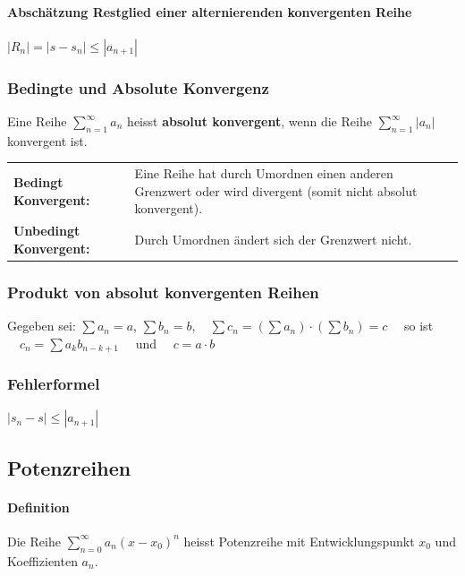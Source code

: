 \paragraph{Abschätzung Restglied einer alternierenden konvergenten Reihe}
	\qquad $|R_n| = |s-s_n|\leq |a_{n+1}|$


\subsubsection{Bedingte und Absolute Konvergenz}
Eine Reihe $\sum\limits_{n=1}^{\infty}a_n$ heisst \textbf{absolut konvergent}, wenn die
Reihe $\sum\limits_{n=1}^{\infty}|a_n|$ konvergent ist.\\

\begin{tabular}{ p{4.5cm}  p{13.5cm}}
	\textbf{Bedingt Konvergent:} &  Eine Reihe hat durch Umordnen einen anderen Grenzwert oder wird divergent (somit nicht absolut konvergent).\\
	\textbf{Unbedingt Konvergent:} &  Durch Umordnen ändert sich der Grenzwert nicht.\\
\end{tabular}

\subsubsection{Produkt von absolut konvergenten Reihen} 
Gegeben sei: $\sum a_n=a$, \quad $\sum b_n=b, \quad \sum c_n = (\sum a_n) \cdot (\sum b_n) = c \quad $ so ist
$ \quad c_n=\sum a_kb_{n-k+1} \quad $ und $ \quad c = a \cdot b $

\subsubsection{Fehlerformel}
	\qquad $|s_n-s|\leq |a_{n+1}|$

\subsection{Potenzreihen}

\paragraph{Definition} 
Die Reihe $ \sum\limits_{n=0}^{\infty} a_n (x-x_0)^n $ heisst Potenzreihe mit Entwicklungspunkt $x_0$ und Koeffizienten $a_n$.


